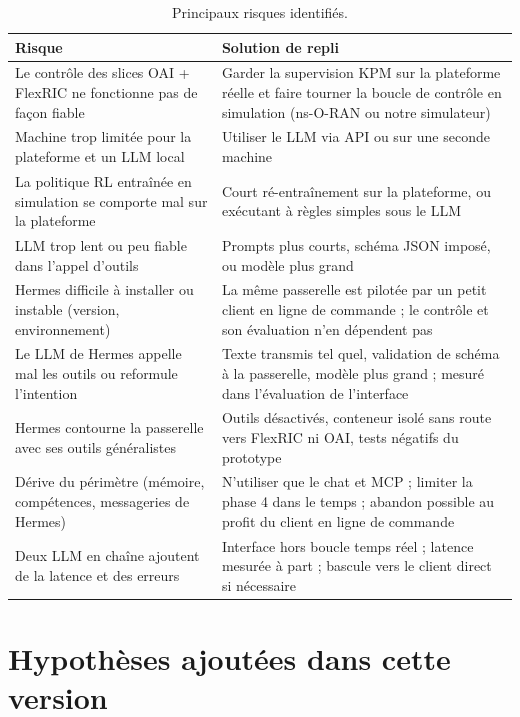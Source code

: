 \documentclass[11pt,a4paper]{article}
\begin{document}
\begin{table}[H]
\centering\small
\begin{tabularx}{\textwidth}{@{}LL@{}}
\toprule
Risque & Solution de repli\\
\midrule
Le contrôle des slices OAI + FlexRIC ne fonctionne pas de façon fiable & Garder la supervision KPM sur la plateforme réelle et faire tourner la boucle de contrôle en simulation (ns-O-RAN ou notre simulateur)\\
Machine trop limitée pour la plateforme et un LLM local & Utiliser le LLM via API ou sur une seconde machine\\
La politique RL entraînée en simulation se comporte mal sur la plateforme & Court ré-entraînement sur la plateforme, ou exécutant à règles simples sous le LLM\\
LLM trop lent ou peu fiable dans l'appel d'outils & Prompts plus courts, schéma JSON imposé, ou modèle plus grand\\
Hermes difficile à installer ou instable (version, environnement) & La même passerelle est pilotée par un petit client en ligne de commande ; le contrôle et son évaluation n'en dépendent pas\\
Le LLM de Hermes appelle mal les outils ou reformule l'intention & Texte transmis tel quel, validation de schéma à la passerelle, modèle plus grand ; mesuré dans l'évaluation de l'interface\\
Hermes contourne la passerelle avec ses outils généralistes & Outils désactivés, conteneur isolé sans route vers FlexRIC ni OAI, tests négatifs du prototype\\
Dérive du périmètre (mémoire, compétences, messageries de Hermes) & N'utiliser que le chat et MCP ; limiter la phase 4 dans le temps ; abandon possible au profit du client en ligne de commande\\
Deux LLM en chaîne ajoutent de la latence et des erreurs & Interface hors boucle temps réel ; latence mesurée à part ; bascule vers le client direct si nécessaire\\
\bottomrule
\end{tabularx}
\caption{Principaux risques identifiés.}
\end{table}

\section{Hypothèses ajoutées dans cette version}
\label{sec:hyp}
\end{document}
